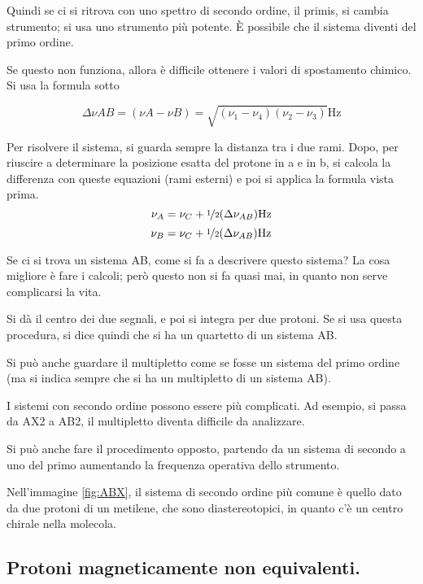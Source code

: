 Quindi se ci si ritrova con uno spettro di secondo ordine, il primis, si
cambia strumento; si usa uno strumento più potente. È possibile che il
sistema diventi del primo ordine.

Se questo non funziona, allora è difficile ottenere i valori di
spostamento chimico. Si usa la formula sotto

\[
  \Delta\nu AB = (\nu A - \nu B ) = \sqrt{(\nu_1 - \nu_4 )(\nu_2 - \nu_3 )} \text{Hz}
\]

Per risolvere il sistema, si guarda sempre la distanza tra i due rami.
Dopo, per riuscire a determinare la posizione esatta del protone in a e
in b, si calcola la differenza con queste equazioni (rami esterni) e poi
si applica la formula vista prima.
\[
  \nu_A = \nu_C + \nicefrac{1}{2} (\Delta\nu_{AB}) \text{Hz}
\]
\[
  \nu_B = \nu_C + \nicefrac{1}{2} (\Delta \nu_{AB}) \text{Hz}
\]

Se ci si trova un sistema AB, come si fa a descrivere questo sistema? La
cosa migliore è fare i calcoli; però questo non si fa quasi mai, in quanto non serve complicarsi la vita.

Si dà il centro dei due segnali, e poi si integra per due protoni. Se si usa questa procedura, si
dice quindi che si ha un quartetto di un sistema AB.

Si può anche guardare il multipletto come se fosse un sistema del primo
ordine (ma si indica sempre che si ha un multipletto di un sistema AB).

I sistemi con secondo ordine possono essere più complicati. Ad esempio,
si passa da AX2 a AB2, il multipletto diventa difficile da analizzare.


Si può anche fare il procedimento opposto, partendo da un sistema di
secondo a uno del primo aumentando la frequenza operativa dello
strumento.


Nell'immagine \ref{fig:ABX}, il sistema di secondo ordine più comune è quello dato da due protoni di
un metilene, che sono diastereotopici, in quanto c'è un centro chirale
nella molecola.



\subsection{Protoni magneticamente non equivalenti.}

